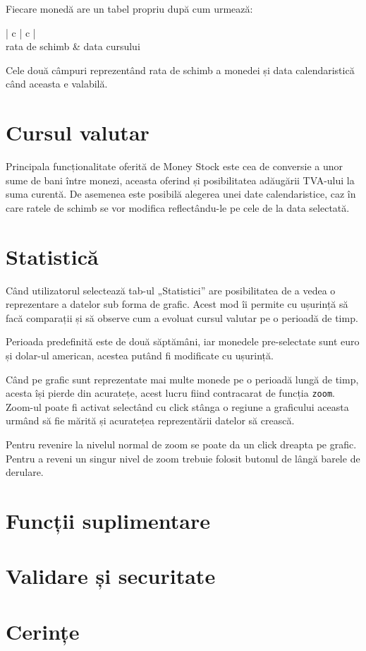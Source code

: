 \documentclass[13pt,a4paper]{report}
\begin{document}
Fiecare monedă are un tabel propriu după cum urmează:

\begin{center}
\begin{tabular}{| c | c |}
     \\ \hline
    rata de schimb & data cursului \\
    \hline
\end{tabular}
\end{center}

Cele două câmpuri reprezentând rata de schimb a monedei și data
calendaristică când aceasta e valabilă.

\section{Cursul valutar}
Principala funcționalitate oferită de Money Stock este cea de conversie a unor
sume de bani între monezi, aceasta oferind și posibilitatea adăugării TVA-ului la
suma curentă.
De asemenea este posibilă alegerea unei date calendaristice, caz în care ratele
de schimb se vor modifica reflectându-le pe cele de la data
selectată.


\section{Statistică} %
Când utilizatorul selectează tab-ul „Statistici” are posibilitatea de a vedea o
reprezentare a datelor sub forma de grafic.
Acest mod îi permite cu ușurință să facă comparații și să observe cum a evoluat
cursul valutar pe o perioadă de timp.

Perioada predefinită este de două săptămâni, iar monedele pre-selectate sunt
euro și dolar-ul american, acestea putând fi modificate cu ușurință.

Când pe grafic sunt reprezentate mai multe monede pe o perioadă lungă de timp,
acesta își pierde din acuratețe, acest lucru fiind contracarat de funcția
\texttt{zoom}.
Zoom-ul poate fi activat selectând cu click stânga o regiune a graficului
aceasta urmând să fie mărită și acuratețea reprezentării datelor să crească.

Pentru revenire la nivelul normal de zoom se poate da un click dreapta pe
grafic. Pentru a reveni un singur nivel de zoom trebuie folosit butonul 
de lângă barele de derulare.

\section{Funcții suplimentare}

\section{Validare și securitate}

\section{Cerințe}
\end{document}
